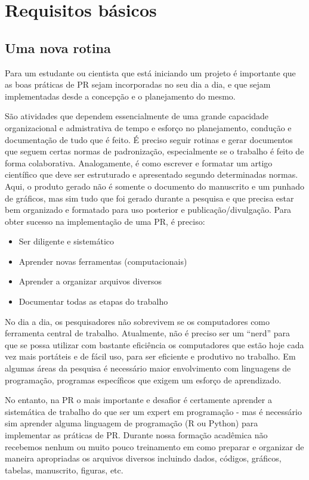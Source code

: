 \documentclass[]{book}
\providecommand{\tightlist}{%
  \setlength{\itemsep}{0pt}\setlength{\parskip}{0pt}}
\begin{document}
\hypertarget{intro}{%
\chapter{Requisitos básicos}\label{intro}}

\hypertarget{uma-nova-rotina}{%
\section{Uma nova rotina}\label{uma-nova-rotina}}

Para um estudante ou cientista que está iniciando um projeto é
importante que as boas práticas de PR sejam incorporadas no seu dia a
dia, e que sejam implementadas desde a concepção e o planejamento do
mesmo.

São atividades que dependem essencialmente de uma grande capacidade
organizacional e admistrativa de tempo e esforço no planejamento,
condução e documentação de tudo que é feito. É preciso seguir rotinas e
gerar documentos que seguem certas normas de padronização, especialmente
se o trabalho é feito de forma colaborativa. Analogamente, é como
escrever e formatar um artigo científico que deve ser estruturado e
apresentado segundo determinadas normas. Aqui, o produto gerado não é
somente o documento do manuscrito e um punhado de gráficos, mas sim tudo
que foi gerado durante a pesquisa e que precisa estar bem organizado e
formatado para uso posterior e publicação/divulgação. Para obter sucesso
na implementação de uma PR, é preciso:

\begin{itemize}
\tightlist
\item
  Ser diligente e sistemático
\item
  Aprender novas ferramentas (computacionais)
\item
  Aprender a organizar arquivos diversos
\item
  Documentar todas as etapas do trabalho
\end{itemize}

No dia a dia, os pesquisadores não sobrevivem se os computadores como
ferramenta central de trabalho. Atualmente, não é preciso ser um
``nerd'' para que se possa utilizar com bastante eficiência os
computadores que estão hoje cada vez mais portáteis e de fácil uso, para
ser eficiente e produtivo no trabalho. Em algumas áreas da pesquisa é
necessário maior envolvimento com linguagens de programação, programas
específicos que exigem um esforço de aprendizado.

No entanto, na PR o mais importante e desafior é certamente aprender a
sistemática de trabalho do que ser um expert em programação - mas é
necessário sim aprender alguma linguagem de programação (R ou Python)
para implementar as práticas de PR. Durante nossa formação acadêmica não
recebemos nenhum ou muito pouco treinamento em como preparar e organizar
de maneira apropriadas os arquivos diversos incluindo dados, códigos,
gráficos, tabelas, manuscrito, figuras, etc.
\end{document}
